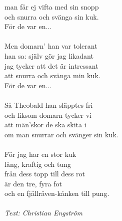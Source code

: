 man får ej vifta med sin snopp\\
och snurra och svänga sin kuk.\\
För de var en...\\
\\
Men domarn' han var tolerant\\
han sa: själv gör jag likadant\\
jag tycker att det är intressant\\
att snurra och svänga min kuk.\\
För de var en...\\
\\
Så Theobald han släpptes fri\\
och liksom domarn tycker vi\\
att män'skor de ska skita i\\
om man snurrar och svänger sin kuk.\\
\\
För jag har en stor kuk\\
lång, kraftig och tung\\
från dess topp till dess rot\\
är den tre, fyra fot\\
och en fjällräven-kånken till pung.\\
\\
{\footnotesize\textit{Text: Christian Engström}}
